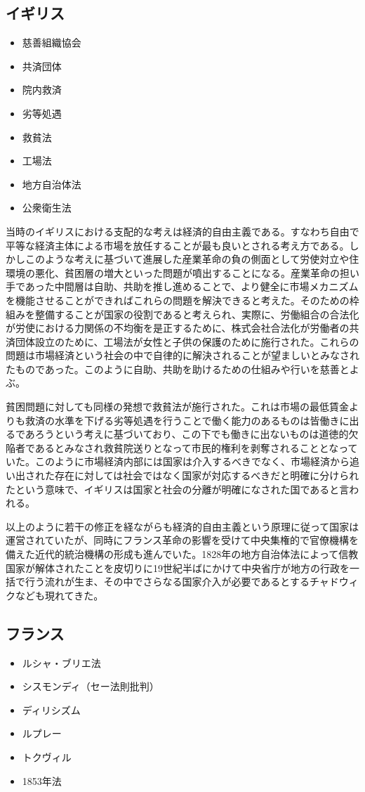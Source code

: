 \documentclass{jsarticle}
\begin{document}
\subsection{イギリス}
\begin{itemize}
	\item 慈善組織協会
	\item 共済団体
	\item 院内救済
	\item 劣等処遇
	\item 救貧法
	\item 工場法
	\item 地方自治体法
	\item 公衆衛生法
\end{itemize}

当時のイギリスにおける支配的な考えは経済的自由主義である。すなわち自由で平等な経済主体による市場を放任することが最も良いとされる考え方である。しかしこのような考えに基づいて進展した産業革命の負の側面として労使対立や住環境の悪化、貧困層の増大といった問題が噴出することになる。産業革命の担い手であった中間層は自助、共助を推し進めることで、より健全に市場メカニズムを機能させることができればこれらの問題を解決できると考えた。そのための枠組みを整備することが国家の役割であると考えられ、実際に、労働組合の合法化が労使における力関係の不均衡を是正するために、株式会社合法化が労働者の共済団体設立のために、工場法が女性と子供の保護のために施行された。これらの問題は市場経済という社会の中で自律的に解決されることが望ましいとみなされたものであった。このように自助、共助を助けるための仕組みや行いを慈善とよぶ。

貧困問題に対しても同様の発想で救貧法が施行された。これは市場の最低賃金よりも救済の水準を下げる劣等処遇を行うことで働く能力のあるものは皆働きに出るであろうという考えに基づいており、この下でも働きに出ないものは道徳的欠陥者であるとみなされ救貧院送りとなって市民的権利を剥奪されることとなっていた。このように市場経済内部には国家は介入するべきでなく、市場経済から追い出された存在に対しては社会ではなく国家が対応するべきだと明確に分けられたという意味で、イギリスは国家と社会の分離が明確になされた国であると言われる。

以上のように若干の修正を経ながらも経済的自由主義という原理に従って国家は運営されていたが、同時にフランス革命の影響を受けて中央集権的で官僚機構を備えた近代的統治機構の形成も進んでいた。1828年の地方自治体法によって信教国家が解体されたことを皮切りに19世紀半ばにかけて中央省庁が地方の行政を一括で行う流れが生ま、その中でさらなる国家介入が必要であるとするチャドウィクなども現れてきた。

\subsection{フランス}
\begin{itemize}
	\item ルシャ・ブリエ法
	\item シスモンディ（セー法則批判）
	\item ディリシズム
	\item ルプレー
	\item トクヴィル
	\item 1853年法
\end{itemize}
\end{document}
